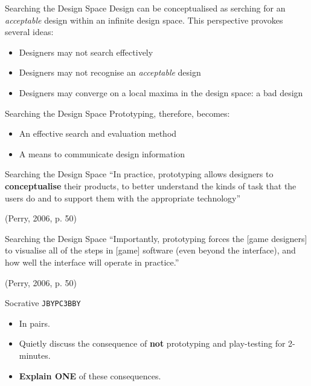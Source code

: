 \begin{frame}{Searching the Design Space}
	Design can be conceptualised as serching for an \textit{acceptable} design within an infinite design space. This perspective provokes
	several ideas:

	\begin{itemize}
		\item Designers may not search effectively
		\item Designers may not recognise an \textit{acceptable} design
		\item Designers may converge on a local maxima in the design space: a bad design
	\end{itemize}
\end{frame}

\begin{frame}{Searching the Design Space}
	Prototyping, therefore, becomes:

	\begin{itemize}
		\item An effective search and evaluation method
		\item A means to communicate design information
	\end{itemize}
\end{frame}

\begin{frame}{Searching the Design Space}
	``In practice, prototyping allows designers to \textbf{conceptualise} their products, to better understand the kinds of task that the users do and to
	support them with the appropriate technology''
	
	\vspace{2ex}
	
	(Perry, 2006, p. 50)
\end{frame}

\begin{frame}{Searching the Design Space}
	``Importantly, prototyping forces the [game designers] to visualise all of the steps in [game] software (even beyond the interface), and how well
	the interface will operate in practice.''
	
	\vspace{2ex}
	
	(Perry, 2006, p. 50)
\end{frame}

\begin{frame}[fragile]{Socrative \texttt{JBYPC3BBY}}
	\begin{itemize}
		\item In pairs.
		\item Quietly discuss the consequence of \textbf{not} prototyping and play-testing for 2-minutes.
		\item \textbf{Explain ONE} of these consequences.
	\end{itemize}
\end{frame}


